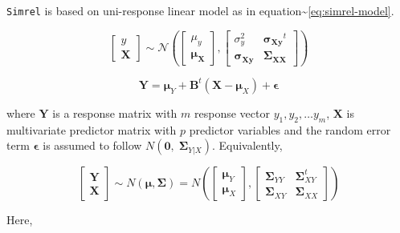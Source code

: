 \documentclass[12pt,a4paperpaper,authoryear]{elsarticle} %
\begin{document}
\texttt{Simrel} is based on uni-response linear model as in
equation\textasciitilde{}\eqref{eq:simrel-model}.

\begin{equation}
\label{eq:simrel-model}
  \begin{bmatrix}
    y \\ \mathbf{X}
  \end{bmatrix} \sim
  \mathcal{N}\left(
    \begin{bmatrix}
      \mu_y \\ \boldsymbol{\mu_X}
    \end{bmatrix},
    \begin{bmatrix}
      \sigma_y^2               & \boldsymbol{\sigma_{Xy}}^t \\
      \boldsymbol{\sigma_{Xy}} & \boldsymbol{\Sigma_{XX}}
    \end{bmatrix}
  \right)
\end{equation}

\begin{equation}
  \mathbf{Y} = \boldsymbol{\mu}_Y + \boldsymbol{B}^t (\mathbf{X} - \boldsymbol{\mu}_X) + \boldsymbol{\epsilon}
  \label{eq:model1}
\end{equation}

where \(\mathbf{Y}\) is a response matrix with \(m\) response vector
\(y_1, y_2, \ldots y_m\), \(\mathbf{X}\) is multivariate predictor
matrix with \(p\) predictor variables and the random error term
\(\boldsymbol{\epsilon}\) is assumed to follow
\(N(\boldsymbol{0},\; \boldsymbol{\Sigma}_{Y|X})\). Equivalently,

\begin{equation}
  \begin{bmatrix}\mathbf{Y}\\ \mathbf{X}\end{bmatrix} \sim N(\boldsymbol{\mu}, \boldsymbol{\Sigma})
  = N \left(
    \begin{bmatrix}
      \boldsymbol{\mu}_Y \\
      \boldsymbol{\mu}_X
    \end{bmatrix},
    \begin{bmatrix}
      \boldsymbol{\Sigma}_{YY} & \boldsymbol{\Sigma}_{XY}^t \\
      \boldsymbol{\Sigma}_{XY} & \boldsymbol{\Sigma}_{XX}
    \end{bmatrix}
  \right)
  \label{eq:model2}
\end{equation}

Here,
\end{document}
